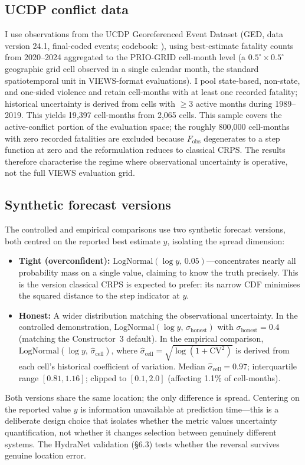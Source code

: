 \subsection{UCDP conflict data}

I use observations from the UCDP Georeferenced Event Dataset (GED, data version 24.1, final-coded events; codebook: \citealt{ucdp_codebook}), using best-estimate fatality counts from 2020--2024 aggregated to the PRIO-GRID cell-month level (a $0.5^\circ \times 0.5^\circ$ geographic grid cell observed in a single calendar month, the standard spatiotemporal unit in VIEWS-format evaluations). I pool state-based, non-state, and one-sided violence and retain cell-months with at least one recorded fatality; historical uncertainty is derived from cells with $\geq 3$ active months during 1989--2019. This yields 19{,}397 cell-months from 2{,}065 cells. This sample covers the active-conflict portion of the evaluation space; the roughly 800{,}000 cell-months with zero recorded fatalities are excluded because $F_\text{obs}$ degenerates to a step function at zero and the reformulation reduces to classical CRPS. The results therefore characterise the regime where observational uncertainty is operative, not the full VIEWS evaluation grid.

\subsection{Synthetic forecast versions}

The controlled and empirical comparisons use two synthetic forecast versions, both centred on the reported best estimate $y$, isolating the spread dimension:
\begin{itemize}
    \item \textbf{Tight (overconfident):} $\text{LogNormal}(\log y, \, 0.05)$---concentrates nearly all probability mass on a single value, claiming to know the truth precisely. This is the version classical CRPS is expected to prefer: its narrow CDF minimises the squared distance to the step indicator at $y$.
    \item \textbf{Honest:} A wider distribution matching the observational uncertainty. In the controlled demonstration, $\text{LogNormal}(\log y, \, \sigma_\text{honest})$ with $\sigma_\text{honest} = 0.4$ (matching the Constructor~3 default). In the empirical comparison, $\text{LogNormal}(\log y, \, \hat{\sigma}_\text{cell})$, where $\hat{\sigma}_\text{cell} = \sqrt{\log(1 + \text{CV}^2)}$ is derived from each cell's historical coefficient of variation. Median $\hat{\sigma}_\text{cell} = 0.97$; interquartile range $[0.81, 1.16]$; clipped to $[0.1, 2.0]$ (affecting 1.1\% of cell-months).
\end{itemize}
Both versions share the same location; the only difference is spread. Centering on the reported value $y$ is information unavailable at prediction time---this is a deliberate design choice that isolates whether the metric values uncertainty quantification, not whether it changes selection between genuinely different systems. The HydraNet validation (\S6.3) tests whether the reversal survives genuine location error.

